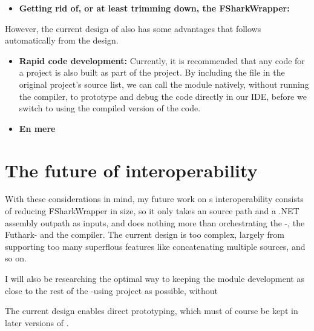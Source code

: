 \begin{itemize}
\item \textbf{Getting rid of, or at least trimming down, the FSharkWrapper:} 
\end{itemize}

However, the current design of \fshark{} also has some advantages that follows
automatically from the design.

\begin{itemize}
\item \textbf{Rapid \fshark{} code development:}
  Currently, it is recommended that any \fshark{} code for a project is also
  built as part of the project.
  By including the \fshark{} file in the original project's source list, we can
  call the \fshark{} module natively, without running the \fshark{} compiler, to
  prototype and debug the \fshark{} code directly in our IDE, before we switch
  to using the compiled version of the \fshark{} code.

\item \textbf{En mere}
\end{itemize}



\section{The future of \fshark{} interoperability}
With these considerations in mind, my future work on \fshark{}s interoperability
consists of reducing FSharkWrapper in size, so it only takes an \fshark{} source path
  and a .NET assembly outpath as inputs, and does nothing more than
  orchestrating the \fshark{}-, the Futhark- and the \csharp compiler.
  The current design is too complex, largely from supporting too many superflous
  features like concatenating multiple sources, and so on.

I will also be researching the optimal way to keeping the \fshark{} module development as
  close to the rest of the \fshark{}-using project as possible, without %
  
The current design enables direct prototyping, which must of course be kept
in later versions of \fshark{}.





